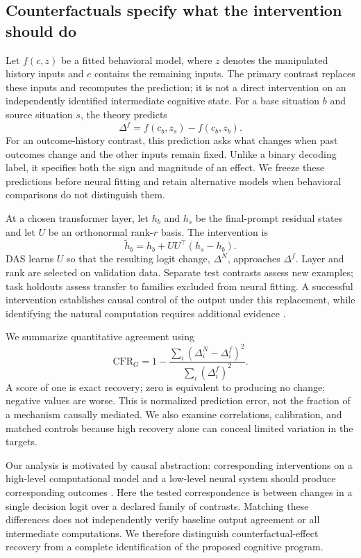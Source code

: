 \documentclass{article}
\newcommand{\cfr}{\mathrm{CFR}_{G}}
\begin{document}
\subsection{Counterfactuals specify what the intervention should do}\label{sec:causal}
Let $f(c,z)$ be a fitted behavioral model, where $z$ denotes the manipulated history inputs and $c$ contains the remaining inputs. The primary contrast replaces these inputs and recomputes the prediction; it is not a direct intervention on an independently identified intermediate cognitive state. For a base situation $b$ and source situation $s$, the theory predicts
\begin{equation}
\Delta^f=f(c_b,z_s)-f(c_b,z_b).
\label{eq:counterfactual}
\end{equation}
For an outcome-history contrast, this prediction asks what changes when past outcomes change and the other inputs remain fixed. Unlike a binary decoding label, it specifies both the sign and magnitude of an effect. We freeze these predictions before neural fitting and retain alternative models when behavioral comparisons do not distinguish them.

At a chosen transformer layer, let $h_b$ and $h_s$ be the final-prompt residual states and let $U$ be an orthonormal rank-$r$ basis. The intervention is
\begin{equation}
\widetilde h_b=h_b+UU^\top(h_s-h_b).
\end{equation}
DAS learns $U$ so that the resulting logit change, $\Delta^N$, approaches $\Delta^f$. Layer and rank are selected on validation data. Separate test contrasts assess new examples; task holdouts assess transfer to families excluded from neural fitting. A successful intervention establishes causal control of the output under this replacement, while identifying the natural computation requires additional evidence \citep{makelov2024illusion}.

We summarize quantitative agreement using
\begin{equation}
\cfr=1-\frac{\sum_i(\Delta_i^N-\Delta_i^f)^2}{\sum_i(\Delta_i^f)^2}.
\end{equation}
A score of one is exact recovery; zero is equivalent to producing no change; negative values are worse. This is normalized prediction error, not the fraction of a mechanism causally mediated. We also examine correlations, calibration, and matched controls because high recovery alone can conceal limited variation in the targets.

Our analysis is motivated by causal abstraction: corresponding interventions on a high-level computational model and a low-level neural system should produce corresponding outcomes \citep{geiger2025foundation}. Here the tested correspondence is between changes in a single decision logit over a declared family of contrasts. Matching these differences does not independently verify baseline output agreement or all intermediate computations. We therefore distinguish counterfactual-effect recovery from a complete identification of the proposed cognitive program.
\end{document}
